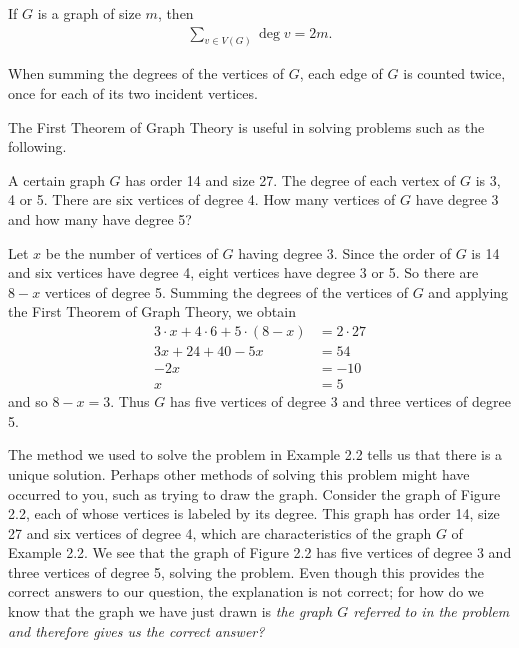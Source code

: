 

\begin{thm}
If $G$ is a graph of size $m$, then
\begin{align*}
\sum\limits_{v \in V(G)} \deg{}{v} = 2m.
\end{align*}
\end{thm}

\begin{pf}
When summing the degrees of the vertices of $G$, each edge of $G$ is counted twice, once for each of its two incident vertices.
\end{pf}

The First Theorem of Graph Theory is useful in solving problems such as the following.

\begin{exmp}\let\qed\relax
A certain graph $G$ has order 14 and size 27. The degree of each vertex of $G$ is 3, 4 or 5. There are six vertices of degree 4. How many vertices of $G$ have degree 3 and how many have degree 5?
\end{exmp}

\begin{soln}
Let $x$ be the number of vertices of $G$ having degree 3. Since the order of $G$ is 14 and six vertices have degree 4, eight vertices have degree 3 or 5. So there are $8-x$ vertices of degree 5. Summing the degrees of the vertices of $G$ and applying the First Theorem of Graph Theory, we obtain
\begin{align*}
3 \cdot x + 4 \cdot 6 + 5 \cdot (8-x) &= 2 \cdot 27 \\
3x + 24 + 40 - 5x &= 54 \\
-2x &= -10 \\
x &= 5
\end{align*}
and so $8-x = 3$. Thus $G$ has five vertices of degree 3 and three vertices of degree 5.
\end{soln}

The method we used to solve the problem in Example 2.2 tells us that there is a unique solution. Perhaps other methods of solving this problem might have occurred to you, such as trying to draw the graph. Consider the graph of Figure 2.2, each of whose vertices is labeled by its degree. This graph has order 14, size 27 and six vertices of degree 4, which are characteristics of the graph $G$ of Example 2.2. We see that the graph of Figure 2.2 has five vertices of degree 3 and three vertices of degree 5, solving the problem. Even though this provides the correct answers to our question, the explanation is not correct; for how do we know that the graph we have just drawn is \it{the} graph $G$ referred to in the problem and therefore gives us the correct answer?

